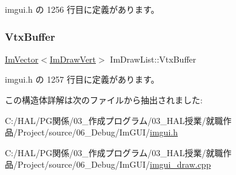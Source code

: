 imgui.\+h の 1256 行目に定義があります。

\mbox{\label{struct_im_draw_list_aa8ff4aee39cf3c3791b7e29a7b4264be}} 
\subsubsection{\texorpdfstring{Vtx\+Buffer}{VtxBuffer}}
{\footnotesize\ttfamily \mbox{\hyperlink{class_im_vector}{Im\+Vector}}$<$\mbox{\hyperlink{struct_im_draw_vert}{Im\+Draw\+Vert}}$>$ Im\+Draw\+List\+::\+Vtx\+Buffer}



 imgui.\+h の 1257 行目に定義があります。



この構造体詳解は次のファイルから抽出されました\+:\begin{DoxyCompactItemize}
\item 
C\+:/\+H\+A\+L/\+P\+G関係/03\+\_\+作成プログラム/03\+\_\+\+H\+A\+L授業/就職作品/\+Project/source/06\+\_\+\+Debug/\+Im\+G\+U\+I/\mbox{\hyperlink{imgui_8h}{imgui.\+h}}\item 
C\+:/\+H\+A\+L/\+P\+G関係/03\+\_\+作成プログラム/03\+\_\+\+H\+A\+L授業/就職作品/\+Project/source/06\+\_\+\+Debug/\+Im\+G\+U\+I/\mbox{\hyperlink{imgui__draw_8cpp}{imgui\+\_\+draw.\+cpp}}\end{DoxyCompactItemize}
